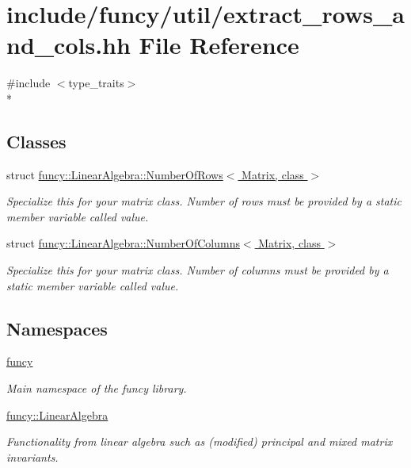 \hypertarget{extract__rows__and__cols_8hh}{\section{include/funcy/util/extract\-\_\-rows\-\_\-and\-\_\-cols.hh File Reference}
\label{extract__rows__and__cols_8hh}
}
{\ttfamily \#include $<$type\-\_\-traits$>$}\\*
\subsection*{Classes}
\begin{DoxyCompactItemize}
\item 
struct \hyperlink{structfuncy_1_1LinearAlgebra_1_1NumberOfRows}{funcy\-::\-Linear\-Algebra\-::\-Number\-Of\-Rows$<$ Matrix, class $>$}
\begin{DoxyCompactList}\small\item\em Specialize this for your matrix class. Number of rows must be provided by a static member variable called value. \end{DoxyCompactList}\item 
struct \hyperlink{structfuncy_1_1LinearAlgebra_1_1NumberOfColumns}{funcy\-::\-Linear\-Algebra\-::\-Number\-Of\-Columns$<$ Matrix, class $>$}
\begin{DoxyCompactList}\small\item\em Specialize this for your matrix class. Number of columns must be provided by a static member variable called value. \end{DoxyCompactList}\end{DoxyCompactItemize}
\subsection*{Namespaces}
\begin{DoxyCompactItemize}
\item 
\hyperlink{namespacefuncy}{funcy}
\begin{DoxyCompactList}\small\item\em Main namespace of the funcy library. \end{DoxyCompactList}\item 
\hyperlink{namespacefuncy_1_1LinearAlgebra}{funcy\-::\-Linear\-Algebra}
\begin{DoxyCompactList}\small\item\em Functionality from linear algebra such as (modified) principal and mixed matrix invariants. \end{DoxyCompactList}\end{DoxyCompactItemize}
